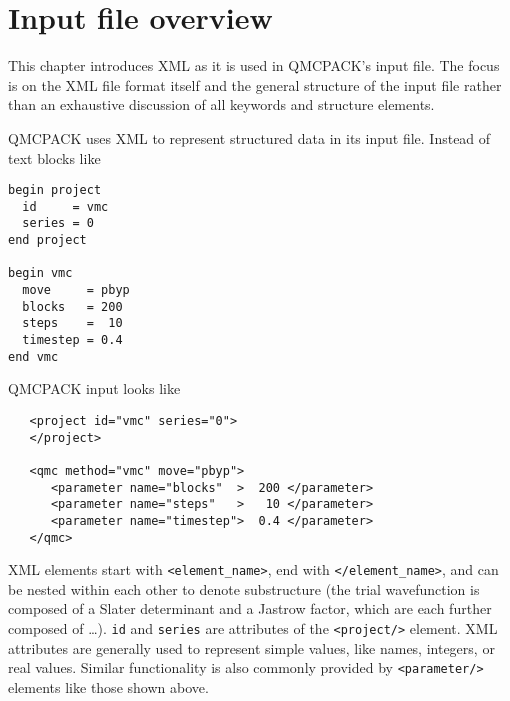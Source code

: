 \chapter{Input file overview}
\label{chap:input_overview}

This chapter introduces XML as it is used in QMCPACK's input file.  The focus is on the XML file format itself and the general structure of the input file rather than an exhaustive discussion of all keywords and structure elements.  

QMCPACK uses XML to represent structured data in its input file.  Instead of text blocks like
\begin{shaded}
\begin{verbatim}
begin project
  id     = vmc
  series = 0
end project

begin vmc
  move     = pbyp
  blocks   = 200
  steps    =  10
  timestep = 0.4
end vmc
\end{verbatim}
\end{shaded}
QMCPACK input looks like
\begin{shaded}
\begin{verbatim}
   <project id="vmc" series="0">
   </project>

   <qmc method="vmc" move="pbyp">
      <parameter name="blocks"  >  200 </parameter>
      <parameter name="steps"   >   10 </parameter>
      <parameter name="timestep">  0.4 </parameter>
   </qmc>
\end{verbatim}
\end{shaded}
XML elements start with \texttt{<element\_name>}, end with \texttt{</element\_name>}, and can be nested within each other to denote substructure (the trial wavefunction is composed of a Slater determinant and a Jastrow factor, which are each further composed of \ldots).  \texttt{id} and \texttt{series} are attributes of the \texttt{<project/>} element.  XML attributes are generally used to represent simple values, like names, integers, or real values.  Similar functionality is also commonly provided by \texttt{<parameter/>} elements like those shown above.

